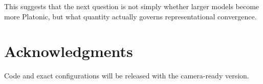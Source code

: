 \documentclass[11pt]{article}
\begin{document}
This suggests that the next question is not simply whether larger models become more Platonic, but what quantity actually governs representational convergence.

\section*{Acknowledgments}
Code and exact configurations will be released with the camera-ready version.



\end{document}
